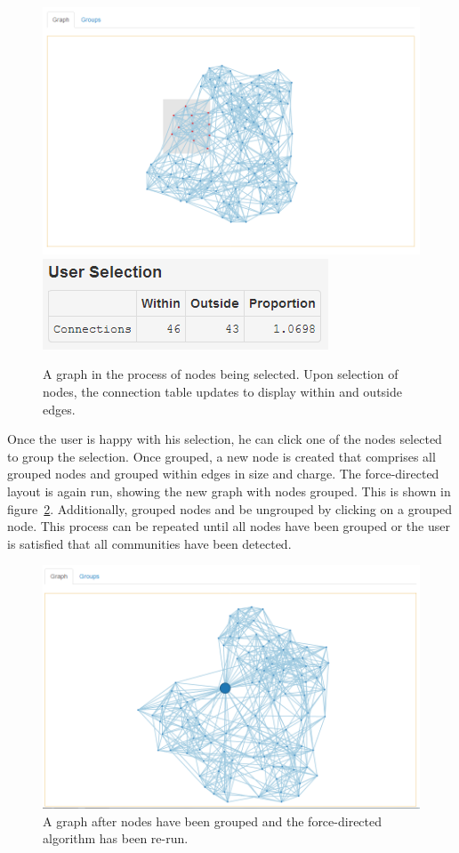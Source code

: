 \documentclass{article}\usepackage[]{graphicx}\usepackage[]{color}
\begin{document}
\begin{figure}[hbtp]
\centering
\includegraphics[width=\textwidth]{images/graphselect.png}
\includegraphics[]{images/tableselect.png}
\caption{\label{fig:graphselect} A graph in the process of nodes being selected. Upon selection of nodes, the connection table updates to display within and outside edges.}
\end{figure}

Once the user is happy with his selection, he can click one of the nodes selected to group the selection. Once grouped, a new node is created that comprises all grouped nodes and grouped within edges in size and charge. The force-directed layout is again run, showing the new graph with nodes grouped. This is shown in figure~\ref{fig:graphgroup}. Additionally, grouped nodes and be ungrouped by clicking on a grouped node. This process can be repeated until all nodes have been grouped or the user is satisfied that all communities have been detected. 

\begin{figure}[hbtp]
\centering
\includegraphics[width=\textwidth]{images/graphgroup.png}
\caption{\label{fig:graphgroup} A graph after nodes have been grouped and the force-directed algorithm has been re-run.}
\end{figure}
\end{document}
